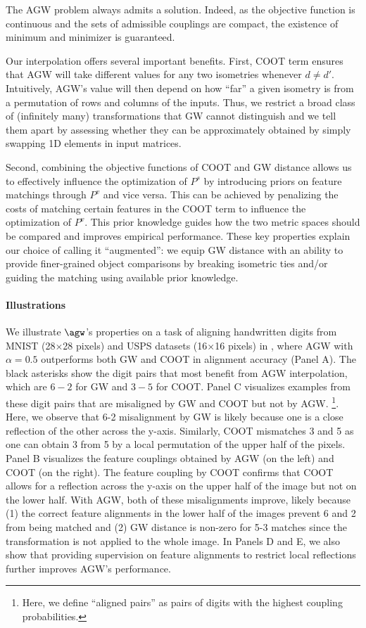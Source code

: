 The AGW problem always admits a solution. Indeed, as the objective function is continuous
and the sets of admissible couplings are compact, the existence of minimum and minimizer
is guaranteed.

Our interpolation offers several important benefits. First, COOT term ensures that AGW
will take different values for any two isometries whenever $d \neq d'$. Intuitively,
AGW's value will then depend on how ``far'' a given isometry is from a permutation of rows
and columns of the inputs. Thus, we restrict a broad class of (infinitely many) transformations
that GW cannot distinguish and we tell them apart by assessing whether they
can be approximately obtained by simply swapping 1D elements in input matrices.

Second, combining the objective functions of COOT and GW distance allows us to
effectively influence the optimization of $P^s$ by introducing priors on feature matchings
through $P^v$ and vice versa. This can be achieved by penalizing the costs of matching
certain features in the COOT term to influence the optimization of $P^v$. This prior knowledge
guides how the two metric spaces should be compared and improves empirical performance.
These key properties explain our choice of calling it ``augmented'':
we equip GW distance with an ability to provide finer-grained object comparisons by
breaking isometric ties and/or guiding the matching using available prior knowledge.

\paragraph{Illustrations} We illustrate $\agw$'s properties on a task of aligning handwritten digits
from MNIST \citep{lecun10} (28$\times$28 pixels) and USPS datasets (16$\times$16 pixels)
\citep{Hull94} in , where AGW with $\alpha=0.5$ outperforms both GW and COOT
in alignment accuracy (Panel A). The black asterisks show the digit pairs that most benefit
from AGW interpolation, which are $6-2$ for GW and $3-5$ for COOT.
Panel C visualizes examples from these digit pairs that are misaligned by GW and COOT
but not by AGW.
\footnote{Here, we define ``aligned pairs'' as pairs of digits with the
highest coupling probabilities.}. Here, we observe that 6-2 misalignment by GW is likely because
one is a close reflection of the other across the y-axis. Similarly,
COOT mismatches 3 and 5 as one can obtain 3 from 5 by a local permutation of
the upper half of the pixels. Panel B visualizes the feature couplings obtained by
AGW (on the left) and COOT (on the right). The feature coupling by COOT confirms that
COOT allows for a reflection across the y-axis on the upper half of the image
but not on the lower half. With AGW, both of these misalignments improve,
likely because (1) the correct feature alignments in the lower half of the images
prevent 6 and 2 from being matched and (2) GW distance is non-zero for 5-3 matches
since the transformation is not applied to the whole image. In Panels D and E,
we also show that providing supervision on feature alignments to restrict local reflections
further improves AGW's performance.

